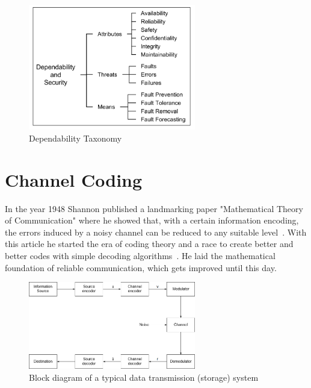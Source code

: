 \documentclass[]{myclass}
\begin{document}
\begin  {figure}  [H]
\centering
\includegraphics[width=0.65\textwidth]{figures/DepTax.PNG}
\caption{Dependability Taxonomy~\cite{art:Avizienis}}
\label{fig:deptax}
\end {figure}

\section{Channel Coding} \label{sec:cod}
In the year 1948 Shannon published a landmarking paper "Mathematical Theory of Communication" where he showed that, with a certain information encoding, the errors induced by a noisy channel can be reduced to any suitable level~\cite{art:Shannon}. With this article he started the era of coding theory and a race to create better and better codes with simple decoding algorithms~\cite{book:Lint}. He laid the mathematical foundation of reliable communication, which gets improved until this day.\\

\begin  {figure}  [H]
\centering
\includegraphics[width=0.65\textwidth]{figures/Data_transmission_path.png}
\caption{Block diagram of a typical data transmission (storage) system~\cite{book:LinCostello}}
\label{fig:data_path}
\end {figure}
\end{document}
